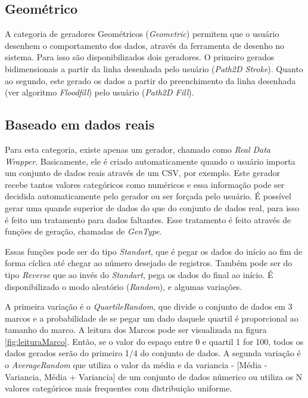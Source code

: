 \documentclass[
	12pt,				%
	openright,			%
	twoside,			%
	a4paper,			%
	english,			%
	brazil				%
	]{abntex2}
\begin{document}
		\subsection{Geométrico}
			A categoria de geradores Geométricos (\emph{Geometric}) permitem que o usuário desenhem o comportamento dos dados, através da ferramenta de desenho no sistema.
			Para isso são disponibilizados dois geradores.
			O primeiro gerados bidimensionais a partir da linha desenhada pelo usuário (\emph{Path2D Stroke}).
			Quanto ao segundo, este gerado os dados a partir do preenchimento da linha desenhada (ver algoritmo \emph{Floodfill}) pelo usuário (\emph{Path2D Fill}).
		\subsection{Baseado em dados reais}
			Para esta categoria, existe apenas um gerador, chamado como \emph{Real Data Wrapper}.
			Basicamente, ele é criado automaticamente quando o usuário importa um conjunto de dados reais através de um CSV, por exemplo.
			Este gerador recebe tantos valores categóricos como numéricos e essa informação pode ser decidida automaticamente pelo gerador ou ser forçada pelo usuário.
			É possível gerar uma quande superior de dados do que do conjunto de dados real, para isso é feito um tratamento para dados faltantes.
			Esse tratamento é feito através de funções de geração, chamadas de \emph{GenType}.
			\par
			Essas funções pode ser do tipo \emph{Standart}, que é pegar os dados do início ao fim de forma cíclica até chegar ao número desejado de registros.
			Também pode ser do tipo \emph{Reverse} que ao invés do \emph{Standart}, pega os dados do final ao início.
			É disponibilizado o modo aleatório (\emph{Random}), e algumas variações.
			\par
			A primeira variação é o \emph{QuartileRandom}, que divide o conjunto de dados em 3 marcos e a probabilidade de se pegar um dado daquele quartil é proporcional ao tamanho do marco.
			A leitura dos Marcos pode ser visualizada na figura \ref{fig:leituraMarco}. Então, se o valor do espaço entre 0 e quartil 1 for 100, todos os dados gerados serão do primeiro 1/4 do conjunto de dados.
			A segunda variação é o \emph{AverageRandom} que utiliza o valor da média e da variancia - [Média - Variancia, Média + Variancia] de um conjunto de dados númerico ou utiliza os N valores categóricos mais frequentes com distribuição uniforme.
\end{document}
